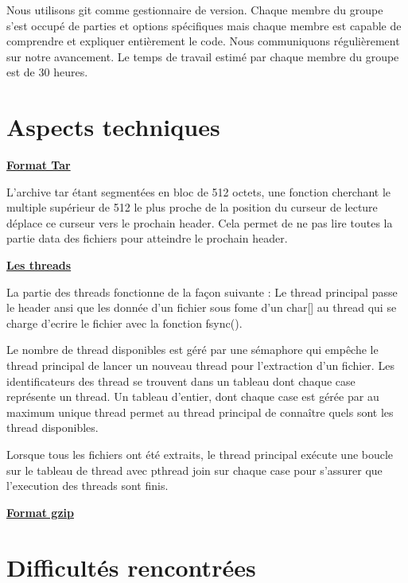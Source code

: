 \documentclass[a4paper,11pt, oneside]{book}
\begin{document}
	\par{Nous utilisons git comme gestionnaire de version. Chaque membre du groupe s'est occupé de parties et options spécifiques mais chaque membre est capable de comprendre et expliquer entièrement le code. Nous communiquons régulièrement sur notre avancement.\newline
Le temps de travail estimé par chaque membre du groupe est de 30 heures.}\newline

{\let\clearpage\relax\chapter{Aspects techniques}}

\textbf{\underline{Format Tar}}\newline
\par{L'archive tar étant segmentées en bloc de 512 octets, une fonction cherchant le multiple supérieur de 512 le plus proche de la position du curseur de lecture déplace ce curseur vers le prochain header. Cela permet de ne pas lire toutes la partie data des fichiers pour atteindre le prochain header.}
\newpage

\textbf{\underline{Les threads}}\newline
\par{La partie des threads fonctionne de la façon suivante : Le thread principal passe le header ansi que les donnée d'un fichier sous fome d'un char[] au thread qui se charge d'ecrire le fichier avec la fonction fsync().}

\par{Le nombre de thread disponibles est géré par une sémaphore qui empêche le thread principal de lancer un nouveau thread pour l'extraction d'un fichier. Les identificateurs des thread se trouvent dans un tableau dont chaque case représente un thread. Un tableau d'entier, dont chaque case est gérée par  au maximum unique thread permet au thread principal de connaître quels sont les thread disponibles.}

\par{Lorsque tous les fichiers ont été extraits, le thread principal exécute une boucle sur le tableau de thread  avec pthread join sur chaque case pour s'assurer que l'execution des  threads sont finis.}

\textbf{\underline{Format gzip}}\newline

\newpage
{\let\clearpage\relax\chapter{Difficultés rencontrées}}
\end{document}
